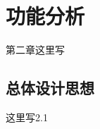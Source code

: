 
\renewcommand{\baselinestretch}{1.345}
\fontsize{12pt}{14.4pt}\selectfont
\chapter{功能分析}
第二章这里写
\section{总体设计思想}

这里写2.1

\endinput